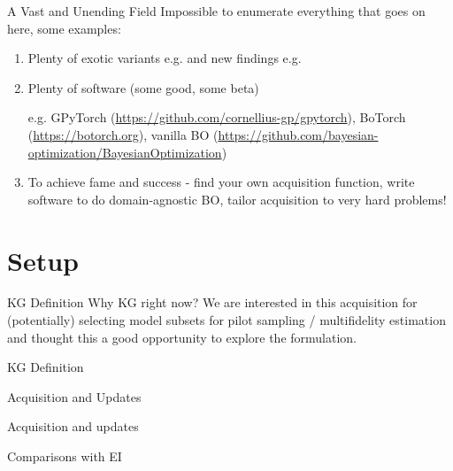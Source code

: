 \documentclass[usenames,dvipsnames]{beamer}
\theoremstyle{definition}
\let\oldcite=\cite
\renewcommand{\cite}[2][]{\textcolor{blue}{\oldcite[#1]{#2}}}
\begin{document}
\begin{frame}{A Vast and Unending Field}
Impossible to enumerate everything that goes on here, some examples:
\begin{enumerate}
    \item Plenty of exotic variants e.g. \cite{eriksson_scalable_2020,miller_targeted_2024,astudillo_bayesian_2019,brochu_portfolio_2011} and new findings e.g. \cite{hvarfner_vanilla_2024}
    


    \item Plenty of software (some good, some beta)

    e.g. GPyTorch (\url{https://github.com/cornellius-gp/gpytorch}), BoTorch (\url{https://botorch.org}), vanilla BO (\url{https://github.com/bayesian-optimization/BayesianOptimization})

    \item To achieve fame and success - find your own acquisition function, write software to do domain-agnostic BO, tailor acquisition to very hard problems!
\end{enumerate}
    
\end{frame}

\section{Setup}
\begin{frame}{KG Definition}
Why KG right now? We are interested in this acquisition for (potentially) selecting model subsets for pilot sampling / multifidelity estimation and thought this a good opportunity to explore the formulation.


\end{frame}

\begin{frame}{KG Definition}
    
\end{frame}

\begin{frame}{Acquisition and Updates}
    
\end{frame}

\begin{frame}{Acquisition and updates}


\end{frame}

\begin{frame}{Comparisons with EI}
    
\end{frame}
\end{document}
